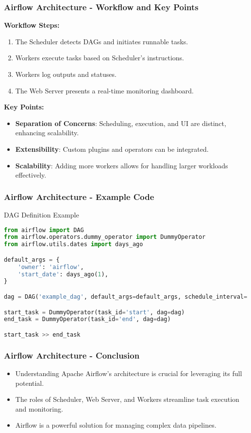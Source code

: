 \documentclass[aspectratio=169]{beamer}
\begin{document}
\begin{frame}[fragile]
    \frametitle{Airflow Architecture - Workflow and Key Points}
    \textbf{Workflow Steps:}
    \begin{enumerate}
        \item The Scheduler detects DAGs and initiates runnable tasks.
        \item Workers execute tasks based on Scheduler's instructions.
        \item Workers log outputs and statuses.
        \item The Web Server presents a real-time monitoring dashboard.
    \end{enumerate}
    
    \textbf{Key Points:}
    \begin{itemize}
        \item \textbf{Separation of Concerns}: Scheduling, execution, and UI are distinct, enhancing scalability.
        \item \textbf{Extensibility}: Custom plugins and operators can be integrated.
        \item \textbf{Scalability}: Adding more workers allows for handling larger workloads effectively.
    \end{itemize}
\end{frame}

\begin{frame}[fragile]
    \frametitle{Airflow Architecture - Example Code}
    \begin{block}{DAG Definition Example}
    \begin{lstlisting}[language=Python]
from airflow import DAG
from airflow.operators.dummy_operator import DummyOperator
from airflow.utils.dates import days_ago

default_args = {
    'owner': 'airflow',
    'start_date': days_ago(1),
}

dag = DAG('example_dag', default_args=default_args, schedule_interval='@daily')

start_task = DummyOperator(task_id='start', dag=dag)
end_task = DummyOperator(task_id='end', dag=dag)

start_task >> end_task
    \end{lstlisting}
    \end{block}
\end{frame}

\begin{frame}[fragile]
    \frametitle{Airflow Architecture - Conclusion}
    \begin{itemize}
        \item Understanding Apache Airflow's architecture is crucial for leveraging its full potential.
        \item The roles of Scheduler, Web Server, and Workers streamline task execution and monitoring.
        \item Airflow is a powerful solution for managing complex data pipelines.
    \end{itemize}
\end{frame}
\end{document}
